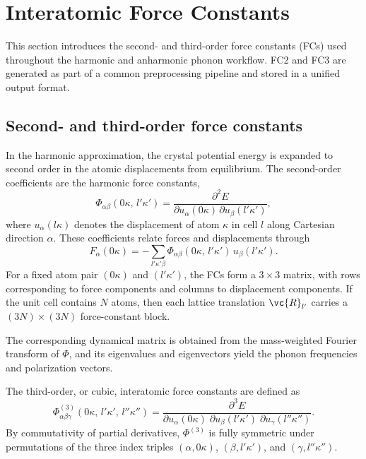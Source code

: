 \section{Interatomic Force Constants}
\label{sec:ifc}

This section introduces the second- and third-order force
constants (FCs) used throughout the harmonic and anharmonic phonon
workflow.  FC2 and FC3 are generated as part of a common preprocessing
pipeline and stored in a unified output format.

\subsection{Second- and third-order force constants}
\label{sec:ifc_definitions}

In the harmonic approximation, the crystal potential energy is expanded
to second order in the atomic displacements from equilibrium.  The
second-order coefficients are the harmonic force constants,
\begin{equation}\label{eq:fc}
  \Phi_{\alpha\beta}(0\kappa,\,l'\kappa')
  = \frac{\partial^2 E}
         {\partial u_\alpha(0\kappa)\,\partial u_\beta(l'\kappa')},
\end{equation}
where $u_\alpha(l\kappa)$ denotes the displacement of atom $\kappa$ in
cell $l$ along Cartesian direction $\alpha$.  These coefficients relate
forces and displacements through
\begin{equation}\label{eq:force-disp}
  F_\alpha(0\kappa)
  = - \sum_{l'\kappa'\beta}
      \Phi_{\alpha\beta}(0\kappa,\,l'\kappa')\,
      u_\beta(l'\kappa').
\end{equation}
For a fixed atom pair $(0\kappa)$ and $(l'\kappa')$, the FCs form a
$3\times 3$ matrix, with rows corresponding to force components and
columns to displacement components.  If the unit cell contains $N$
atoms, then each lattice translation $\vc{R}_{l'}$ carries a
$(3N)\times(3N)$ force-constant block.

The corresponding dynamical matrix is obtained from the mass-weighted
Fourier transform of $\Phi$, and its eigenvalues and eigenvectors yield
the phonon frequencies and polarization vectors.

The third-order, or cubic, interatomic force constants are defined as
\begin{equation}\label{eq:fc3_def}
  \Phi^{(3)}_{\alpha\beta\gamma}(0\kappa,\,l'\kappa',\,l''\kappa'')
  = \frac{\partial^3 E}
         {\partial u_\alpha(0\kappa)\;
          \partial u_\beta(l'\kappa')\;
          \partial u_\gamma(l''\kappa'')}.
\end{equation}
By commutativity of partial derivatives, $\Phi^{(3)}$ is fully
symmetric under permutations of the three index triples
$(\alpha,0\kappa)$, $(\beta,l'\kappa')$, and
$(\gamma,l''\kappa'')$.

